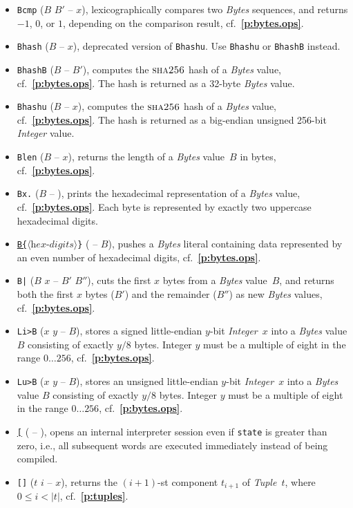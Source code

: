 \documentclass[12pt,oneside]{article}
\def\refpoint#1{{\rm\textbf{\ref{#1}}}}
\let\ptref=\refpoint
\def\opsc#1{\operatorname{\textsc{#1}}}
\def\Sha{\opsc{sha256}}
\begin{document}
\begin{itemize}
\item {\tt Bcmp} ($B$ $B'$ -- $x$), lexicographically compares two {\em Bytes\/} sequences, and returns $-1$, $0$, or $1$, depending on the comparison result, cf.~\ptref{p:bytes.ops}.
\item {\tt Bhash} ($B$ -- $x$), deprecated version of {\tt Bhashu}. Use {\tt Bhashu} or {\tt BhashB} instead.
\item {\tt BhashB} ($B$ -- $B'$), computes the $\Sha$ hash of a {\em Bytes\/} value, cf.~\ptref{p:bytes.ops}. The hash is returned as a 32-byte {\em Bytes\/} value.
\item {\tt Bhashu} ($B$ -- $x$), computes the $\Sha$ hash of a {\em Bytes\/} value, cf.~\ptref{p:bytes.ops}. The hash is returned as a big-endian unsigned 256-bit {\em Integer\/} value.
\item {\tt Blen} ($B$ -- $x$), returns the length of a {\em Bytes\/} value~$B$ in bytes, cf.~\ptref{p:bytes.ops}.
\item {\tt Bx.} ($B$ -- ), prints the hexadecimal representation of a {\em Bytes\/} value, cf.~\ptref{p:bytes.ops}. Each byte is represented by exactly two uppercase hexadecimal digits.
\item {\tt \underline{B\{}$\langle{\textit{hex-digits}}\rangle$\}} ( -- $B$), pushes a {\em Bytes\/} literal containing data represented by an even number of hexadecimal digits, cf.~\ptref{p:bytes.ops}.
\item {\tt B|} ($B$ $x$ -- $B'$ $B''$), cuts the first $x$ bytes from a {\em Bytes\/} value~$B$, and returns both the first $x$ bytes ($B'$) and the remainder ($B''$) as new {\em Bytes\/} values, cf.~\ptref{p:bytes.ops}.
\item {\tt Li>B} ($x$ $y$ -- $B$), stores a signed little-endian $y$-bit {\em Integer\/}~$x$ into a {\em Bytes\/} value $B$ consisting of exactly $y/8$ bytes. Integer $y$ must be a multiple of eight in the range $0\ldots256$, cf.~\ptref{p:bytes.ops}.
\item {\tt Lu>B} ($x$ $y$ -- $B$), stores an unsigned little-endian $y$-bit {\em Integer\/}~$x$ into a {\em Bytes\/} value $B$ consisting of exactly $y/8$ bytes. Integer $y$ must be a multiple of eight in the range $0\ldots256$, cf.~\ptref{p:bytes.ops}.
\item {\tt \underline{[}} ( -- ), opens an internal interpreter session even if {\tt state} is greater than zero, i.e., all subsequent words are executed immediately instead of being compiled.
\item {\tt []} ($t$ $i$ -- $x$), returns the $(i+1)$-st component $t_{i+1}$ of {\em Tuple\/}~$t$, where $0\leq i<|t|$, cf.~\ptref{p:tuples}.

\end{itemize}
\end{document}
